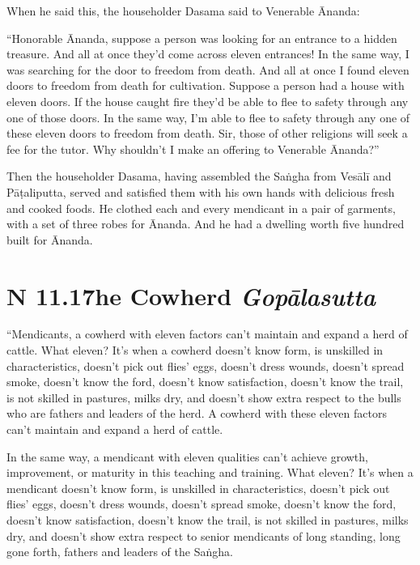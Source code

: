 \documentclass[12pt,openany]{book}%
\newcommand*{\suttatitleacronym}[1]{\smaller[2]{#1}\vspace*{.3em}}
\newcommand*{\suttatitletranslation}[1]{\linebreak{#1}}
\newcommand*{\suttatitleroot}[1]{\linebreak\smaller[2]\itshape{#1}}
\newcommand*{\tocacronym}[1]{\hspace*{-3.3em}{#1}\quad}
\newcommand*{\toctranslation}[1]{#1}
\newcommand*{\tocroot}[1]{(\textit{#1})}
\begin{document}
When he said this, the householder Dasama said to Venerable Ānanda: 

“Honorable Ānanda, suppose a person was looking for an entrance to a hidden treasure. And all at once they’d come across eleven entrances! In the same way, I was searching for the door to freedom from death. And all at once I found eleven doors to freedom from death for cultivation. Suppose a person had a house with eleven doors. If the house caught fire they’d be able to flee to safety through any one of those doors. In the same way, I’m able to flee to safety through any one of these eleven doors to freedom from death. Sir, those of other religions will seek a fee for the tutor. Why shouldn’t I make an offering to Venerable Ānanda?” 

Then the householder Dasama, having assembled the \textsanskrit{Saṅgha} from \textsanskrit{Vesālī} and \textsanskrit{Pāṭaliputta}, served and satisfied them with his own hands with delicious fresh and cooked foods. He clothed each and every mendicant in a pair of garments, with a set of three robes for Ānanda. And he had a dwelling worth five hundred built for Ānanda. 

%
\section*{{\suttatitleacronym AN 11.17}{\suttatitletranslation The Cowherd }{\suttatitleroot Gopālasutta}}
\addcontentsline{toc}{section}{\tocacronym{AN 11.17} \toctranslation{The Cowherd } \tocroot{Gopālasutta}}

“Mendicants, a cowherd with eleven factors can’t maintain and expand a herd of cattle. What eleven? It’s when a cowherd doesn’t know form, is unskilled in characteristics, doesn’t pick out flies’ eggs, doesn’t dress wounds, doesn’t spread smoke, doesn’t know the ford, doesn’t know satisfaction, doesn’t know the trail, is not skilled in pastures, milks dry, and doesn’t show extra respect to the bulls who are fathers and leaders of the herd. A cowherd with these eleven factors can’t maintain and expand a herd of cattle. 

In the same way, a mendicant with eleven qualities can’t achieve growth, improvement, or maturity in this teaching and training. What eleven? It’s when a mendicant doesn’t know form, is unskilled in characteristics, doesn’t pick out flies’ eggs, doesn’t dress wounds, doesn’t spread smoke, doesn’t know the ford, doesn’t know satisfaction, doesn’t know the trail, is not skilled in pastures, milks dry, and doesn’t show extra respect to senior mendicants of long standing, long gone forth, fathers and leaders of the \textsanskrit{Saṅgha}. 
\end{document}
